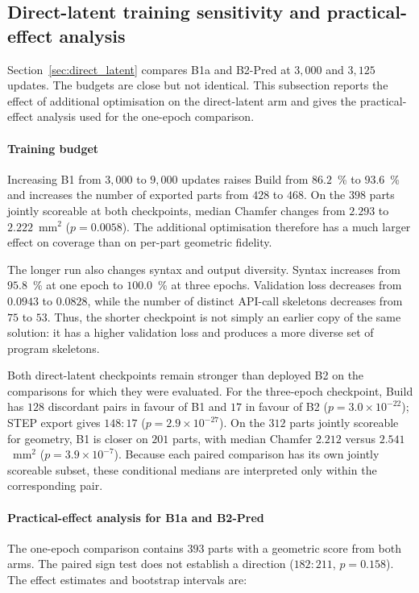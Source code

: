 \documentclass[preprint,12pt]{elsarticle}
\begin{document}
\subsection{Direct-latent training sensitivity and practical-effect analysis}
\label{app:budget}

Section~\ref{sec:direct_latent} compares B1a and B2-Pred at $3{,}000$ and $3{,}125$
updates. The budgets are close but not identical. This subsection reports the effect of
additional optimisation on the direct-latent arm and gives the practical-effect analysis used
for the one-epoch comparison.

\paragraph{Training budget}
Increasing B1 from $3{,}000$ to $9{,}000$ updates raises Build from $86.2$~\% to
$93.6$~\% and increases the number of exported parts from $428$ to $468$. On the $398$
parts jointly scoreable at both checkpoints, median Chamfer changes from $2.293$ to
$2.222$~mm$^2$ ($p = 0.0058$). The additional optimisation therefore has a much larger
effect on coverage than on per-part geometric fidelity.

The longer run also changes syntax and output diversity. Syntax increases from $95.8$~\%
at one epoch to $100.0$~\% at three epochs. Validation loss decreases from $0.0943$ to
$0.0828$, while the number of distinct API-call skeletons decreases from $75$ to $53$.
Thus, the shorter checkpoint is not simply an earlier copy of the same solution: it has a
higher validation loss and produces a more diverse set of program skeletons.

Both direct-latent checkpoints remain stronger than deployed B2 on the comparisons for which
they were evaluated. For the three-epoch checkpoint, Build has $128$ discordant pairs in
favour of B1 and $17$ in favour of B2 ($p = 3.0\times10^{-22}$); STEP export gives
$148:17$ ($p = 2.9\times10^{-27}$). On the $312$ parts jointly scoreable for geometry, B1
is closer on $201$ parts, with median Chamfer $2.212$ versus $2.541$~mm$^2$
($p = 3.9\times10^{-7}$). Because each paired comparison has its own jointly scoreable
subset, these conditional medians are interpreted only within the corresponding pair.

\paragraph{Practical-effect analysis for B1a and B2-Pred}
The one-epoch comparison contains $393$ parts with a geometric score from both arms. The
paired sign test does not establish a direction ($182:211$, $p = 0.158$). The effect
estimates and bootstrap intervals are:
\end{document}
